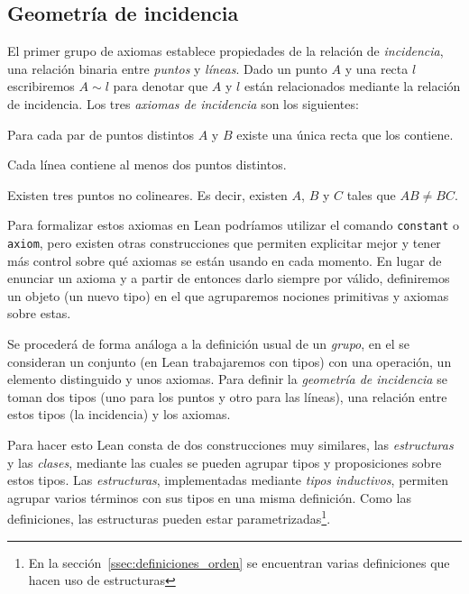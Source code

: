 \subsection{Geometr\'{i}a de incidencia}

El primer grupo de axiomas establece propiedades de la relación de
\textit{incidencia}, una relación binaria entre \textit{puntos} y
\textit{líneas}. Dado un punto $A$ y una recta $l$ escribiremos $A\sim l$ para
denotar que $A$ y $l$ están relacionados mediante la relación de incidencia.
Los tres \textit{axiomas de incidencia} son los siguientes:

\begin{ax}\label{ax:I1}
	Para cada par de puntos distintos $A$ y $B$ existe una única recta que los
	contiene.
\end{ax}

\begin{ax}\label{ax:I2}
	Cada línea contiene al menos dos puntos distintos.
\end{ax}

\begin{ax}\label{ax:I3}
	Existen tres puntos no colineares. Es decir, existen $A$, $B$ y $C$ tales que
	$AB\neq BC$.
\end{ax}

Para formalizar estos axiomas en Lean podríamos utilizar el comando
\lstinline{constant} o \lstinline{axiom}, pero existen otras construcciones que
permiten explicitar mejor y tener más control sobre qué axiomas se están
usando en cada momento. En lugar de enunciar un axioma y a partir de entonces
darlo siempre por válido, definiremos un objeto (un nuevo tipo) en el que
agruparemos nociones primitivas y axiomas sobre estas.

Se procederá de forma análoga a la definición usual de un \textit{grupo}, en el
se consideran un conjunto (en Lean trabajaremos con tipos) con una
operación, un elemento distinguido y unos axiomas. Para definir la
\textit{geometría de incidencia} se toman dos tipos (uno para los puntos y otro
para las líneas), una relación entre estos tipos (la incidencia) y los axiomas.

Para hacer esto Lean consta de dos construcciones muy similares, las
\textit{estructuras} y las \textit{clases}, mediante las cuales se pueden
agrupar tipos y proposiciones sobre estos tipos. Las \textit{estructuras},
implementadas mediante \textit{tipos inductivos}, permiten agrupar varios
términos con sus tipos en una misma definición. Como las definiciones, las
estructuras pueden estar parametrizadas\footnote{En la
	sección~\ref{ssec:definiciones_orden} se encuentran varias definiciones que
	hacen uso de estructuras}.

